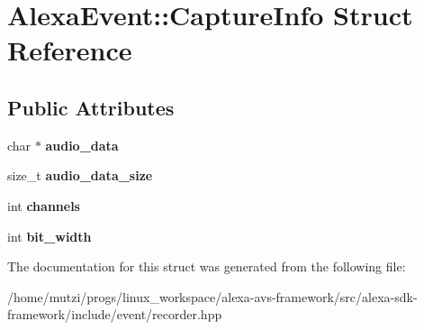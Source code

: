 \hypertarget{structAlexaEvent_1_1CaptureInfo}{}\section{Alexa\+Event\+:\+:Capture\+Info Struct Reference}
\label{structAlexaEvent_1_1CaptureInfo}
\subsection*{Public Attributes}
\begin{DoxyCompactItemize}
\item 
\mbox{\label{structAlexaEvent_1_1CaptureInfo_ac8b85e369d328c63727fe0bfff0c7ae7}} 
char $\ast$ {\bfseries audio\+\_\+data}
\item 
\mbox{\label{structAlexaEvent_1_1CaptureInfo_a568d39c06c92402f0f7b96177bc76be2}} 
size\+\_\+t {\bfseries audio\+\_\+data\+\_\+size}
\item 
\mbox{\label{structAlexaEvent_1_1CaptureInfo_af98b71992be7b6b3998a25317baeeaee}} 
int {\bfseries channels}
\item 
\mbox{\label{structAlexaEvent_1_1CaptureInfo_ad1665b9cc37b483011dd557af4f8b10c}} 
int {\bfseries bit\+\_\+width}
\end{DoxyCompactItemize}


The documentation for this struct was generated from the following file\+:\begin{DoxyCompactItemize}
\item 
/home/mutzi/progs/linux\+\_\+workspace/alexa-\/avs-\/framework/src/alexa-\/sdk-\/framework/include/event/recorder.\+hpp\end{DoxyCompactItemize}
